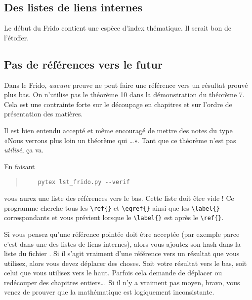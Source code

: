 \subsection{Des listes de liens internes}

Le début du Frido contient une espèce d'index thématique. Il serait bon de l'étoffer.

\subsection{Pas de références vers le futur}

Dans le Frido, \emph{aucune} preuve ne peut faire une référence vers un résultat prouvé plus bas. On n'utilise pas le théorème 10 dans la démonstration du théorème 7. Cela est une contrainte forte sur le découpage en chapitres et sur l'ordre de présentation des matières.

Il est bien entendu accepté et même encouragé de mettre des notes du type «Nous verrons plus loin un théorème qui \ldots». Tant que ce théorème n'est pas \emph{utilisé}, ça va. 

En faisant
\begin{quote}
    \begin{verbatim}
    pytex lst_frido.py --verif
    \end{verbatim}
\end{quote}
vous aurez une liste des références vers le bas. Cette liste doit être vide ! Ce programme cherche tous les \verb+\ref{}+ et \verb+\eqref{}+ ainsi que les \verb+\label{}+ correspondants et vous prévient lorsque le \verb+\label{}+ est après le \verb+\ref{}+.

Si vous pensez qu'une référence pointée doit être acceptée (par exemple parce c'est dans une des listes de liens internes), alors vous ajoutez son hash dans la liste du fichier . Si il s'agit vraiment d'une référence vers un résultat que vous utilisez, alors vous devez déplacer des choses. Soit votre résultat vers le bas, soit celui que vous utilisez vers le haut. Parfois cela demande de déplacer ou redécouper des chapitres entiers\ldots\ Si il n'y a vraiment pas moyen, bravo, vous venez de prouver que la mathématique est logiquement inconsistante.

